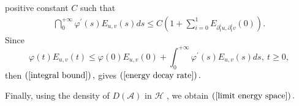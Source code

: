 \documentclass[11pt,reqno]{amsart}
\theoremstyle{plain}
\numberwithin{equation}{section}
\numberwithin{equation}{section}
\begin{document}
positive constant $C$ such that 
\begin{equation}
\begin{array}{c}
\dint_{0}^{+\infty }\varphi ^{\prime }\left( s\right) E_{u,v}\left( s\right)
ds\leq C\left( 1+\sum_{i=0}^{1}E_{\partial _{t}^{i}u,\partial
_{t}^{i}v}\left( 0\right) \right) .%
\end{array}
\label{integral bound}
\end{equation}%
Since%
\begin{equation*}
\varphi \left( t\right) E_{u,v}\left( t\right) \leq \varphi \left( 0\right)
E_{u,v}\left( 0\right) +\int_{0}^{+\infty }\varphi ^{\prime }\left( s\right)
E_{u,v}\left( s\right) ds,~t\geq 0,
\end{equation*}%
then $\left( \ref{integral bound}\right) ,$ gives $\left( \ref{energy decay
rate}\right) .$

Finally, using the density of $D\left( \mathcal{A}\right) $ in $\mathcal{H}$%
, we obtain $\left( \ref{limit energy space}\right) .$
\end{document}
